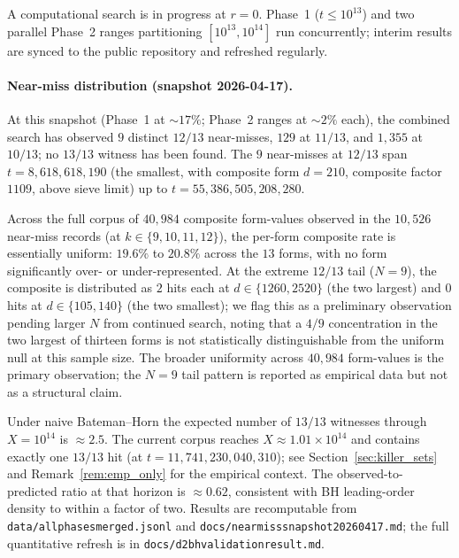 \documentclass[11pt]{article}
\renewcommand{\_}{\origunderscore\allowbreak}
\theoremstyle{definition}
\theoremstyle{remark}
\begin{document}
A computational search is in progress at $r=0$. Phase~1
($t\le 10^{13}$) and two parallel Phase~2 ranges partitioning
$[10^{13}, 10^{14}]$ run concurrently; interim results are
synced to the public repository and refreshed regularly.

\paragraph{Near-miss distribution (snapshot 2026-04-17).}
At this snapshot (Phase~1 at $\sim 17\%$; Phase~2 ranges at
$\sim 2\%$ each), the combined search has observed $9$ distinct
$12/13$ near-misses, $129$ at $11/13$, and $1{,}355$ at $10/13$;
no $13/13$ witness has been found. The $9$ near-misses at $12/13$
span $t = 8{,}618{,}618{,}190$ (the smallest, with composite form
$d=210$, composite factor $1109$, above sieve limit) up to
$t = 55{,}386{,}505{,}208{,}280$.

Across the full corpus of $40{,}984$ composite form-values observed
in the $10{,}526$ near-miss records (at $k\in\{9,10,11,12\}$), the
per-form composite rate is essentially uniform: $19.6\%$ to $20.8\%$
across the $13$ forms, with no form significantly over- or
under-represented. At the extreme $12/13$ tail ($N=9$), the
composite is distributed as $2$ hits each at $d\in\{1260, 2520\}$
(the two largest) and $0$ hits at $d\in\{105, 140\}$ (the two
smallest); we flag this as a preliminary observation pending
larger $N$ from continued search, noting that a $4/9$ concentration
in the two largest of thirteen forms is not statistically distinguishable
from the uniform null at this sample size. The broader uniformity
across $40{,}984$ form-values is the primary observation; the $N=9$
tail pattern is reported as empirical data but not as a structural
claim.

Under naive Bateman--Horn the expected number of $13/13$
witnesses through $X=10^{14}$ is $\approx 2.5$. The current
corpus reaches $X\approx 1.01\times 10^{14}$ and contains exactly
one $13/13$ hit (at $t=11{,}741{,}230{,}040{,}310$); see
Section~\ref{sec:killer_sets} and
Remark~\ref{rem:emp_only} for the empirical context. The
observed-to-predicted ratio at that horizon is $\approx 0.62$,
consistent with BH leading-order density to within a factor of
two. Results are recomputable from
\texttt{data/all\_phases\_merged.jsonl} and
\texttt{docs/near\_miss\_snapshot\_20260417.md}; the full
quantitative refresh is in
\texttt{docs/d2\_bh\_validation\_result.md}.
\end{document}
